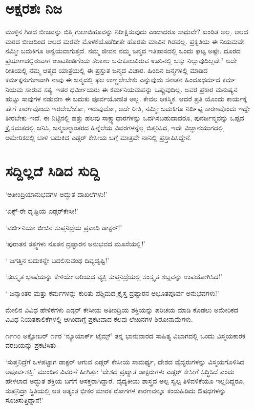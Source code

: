 \section{ಅಕ್ಷರಶಃ ನಿಜ}

ಮುಳ್ಳಿನ ಗಿಡದ ಬೀಜವನ್ನು ಬಿತ್ತಿ ಗುಲಾಬಿಹೂವನ್ನು ನಿರೀಕ್ಷಿಸುವುದು ಎಂದಾದರೂ ಸಾಧುವೇ? ಖಂಡಿತ ಅಲ್ಲ. ಆಲದ ಮರದ ಬೀಜದಿಂದ ಆಲದ ಮರವೇ ಮೊಳಕೆಯೊಡೆದೀತೇ ಹೊರತು ಮಾವಿನ ಗಿಡವಲ್ಲ. ಪ್ರಕೃತಿಯ ಈ ನಿಯಮವೇ ನಮ್ಮೀ ಬದುಕಿಗೂ ಅನ್ವಯವಾಗುತ್ತದೆ. ನಮ್ಮ ಜೀವನ ನಮ್ಮ ಜನ್ಮದ ಇತಿಹಾಸದಲ್ಲಿ ಒಂದು ಘಟ್ಟ ಅಷ್ಟೇ. ದೂರದ ಪ್ರಯಾಣದಲ್ಲಿರುವಾಗ ಊಟತಿಂಡಿಗೆಂದು ಕೆಲಕಾಲ ಅನುಕೂಲವಿರುವ ಊರಿನಲ್ಲಿ ಬಸ್ಸು ನಿಲ್ಲುವುದಿಲ್ಲವೇ? ಅದೇ ರೀತಿಯಲ್ಲಿ ನಮ್ಮ ಆತ್ಮದ ಯಾತ್ರೆಯಲ್ಲಿ ಈ ಪ್ರಸ್ತುತ ಜನ್ಮದ ವಿಚಾರ. ಹಿಂದಿನ ಜನ್ಮಗಳಲ್ಲಿ ಮಾಡಿದ ಕರ್ಮಕ್ಕನುಗುಣವಾಗಿ ನಾವು ಈ ಜನ್ಮದಲ್ಲಿ ಫಲ ಉಣ್ಣಲೇಬೇಕು ಎನ್ನುವುದು ಸನಾತನ ಹಿಂದೂಧರ್ಮದ ಕರ್ಮ ನಿಯಮ ಸಾರುವ ಸತ್ಯ. ಇತರ ಧರ್ಮೀಯರು ಈ ಕರ್ಮನಿಯಮವನ್ನು ಒಪ್ಪುವುದಿಲ್ಲ. ಅವರ ಪ್ರಕಾರ ಮನುಷ್ಯನ ಹುಟ್ಟು ಸಾವುಗಳ ನಡುವಣ ಈ ಬದುಕು ಪೂರ್ವಯೋಜಿತ ಅಲ್ಲ. ಕೇವಲ ಆಕಸ್ಮಿಕ. ಆದರೆ ಪ್ರತಿ ಯೊಂದು ಕಾರ್ಯಕ್ಕೆ ಹೇಗೆ ಕಾರಣವೊಂದು ಇರಲೇಬೇಕೋ, ಇರುವುದೋ, ಅದೇ ರೀತಿ, ನಮ್ಮೀ ಬದುಕಿಗೂ ನಿರ್ದಿಷ್ಟ ಕಾರಣವೊಂದು ಇದ್ದೇ ತೀರಬೇಕು–ಇದೆ. ಈ ನಿಟ್ಟಿನಲ್ಲಿ ಹತ್ತು ಹಲವು ಸಾಕ್ಷ್ಯಾಧಾರಗಳನ್ನು ಒದಗಿಸಬಹುದಾದರೂ, ಪುನರ್ಜನ್ಮವನ್ನು ಒಪ್ಪದ ಕ್ರೈಸ್ತಮತದಲ್ಲಿ ಜನಿಸಿ, ಜನ್ಮಜನ್ಮಾಂತರದ ಹಿನ್ನೆಲೆಯ ವಿವರಗಳನ್ನೆಲ್ಲ ಬಿತ್ತರಿಸಿದ, ಇದೇ ವಿಜ್ಞಾನಯುಗದಲ್ಲಿ ಅಮೇರಿಕದಲ್ಲಿ ಬಾಳಿ ಬದುಕಿದ ಎಡ್ಗರ್ ಕೇಸೀಯ ಬಗ್ಗೆ ಮಾತ್ರವೇ ನಾನಿಲ್ಲಿ ಪ್ರಸ್ತಾಪಿಸಿದ್ದೇನೆ.


\section{ಸದ್ದಿಲ್ಲದೆ ಸಿಡಿದ ಸುದ್ದಿ}

‘ಅತೀಂದ್ರಿಯಾನುಭವಗಳ ಅದ್ಭುತ ದಾಖಲೆಗಳು!’

‘ಎಕ್ಸ್​-ರೇ ದೃಷ್ಟಿಯ ಎಡ್ಗರ್​ಕೇಸೀ!’

‘ವರ್ಜೀನಿಯಾ ಬೀಚಿನ ಸುಪ್ತನಿದ್ರೆಯ ಪ್ರವಾದಿ ಡಾಕ್ಟರ್​!’

‘ಪುರಾತನ ತತ್ತ್ವಗಳು ನೂತನ ದ್ರಷ್ಟಾರನ ಅನುಭವದ ಮೂಸೆಯಲ್ಲಿ!’

‘ ಜಗತ್ತಿನ ಬದುಕನ್ನೇ ಬದಲಿಸುವಂಥ ದಿವ್ಯದೃಷ್ಟಿ!’

‘ಸಂಸ್ಕೃತ ಭಾಷೆಯನ್ನು ಕೇಳಿಯೇ ಅರಿಯದ ವ್ಯಕ್ತಿ ಸುಪ್ತನಿದ್ರೆಯಲ್ಲಿ ಸಂಸ್ಕೃತ ಶಬ್ದವನ್ನು ಉಪಯೋಗಿಸಿದ!’

‘ ಜನ್ಮಾಂತರ ಮತ್ತು ಕರ್ಮಗಳನ್ನು ಕುರಿತು ಪಶ್ಚಿಮದ ಕ್ರೈಸ್ತ ದ್ರಷ್ಟಾರನ ಅಭೂತಪೂರ್ವ ಅನುಭವಗಳು!’

ಮೇಲಿನ ವಿವಿಧ ಹೇಳಿಕೆಗಳು ಎಡ್ಗರ್ ಕೇಸೀಯ ಅತೀಂದ್ರಿಯ ಶಕ್ತಿಯನ್ನು ಪರಿಚಯ ಮಾಡಿ ಕೊಡಲು ಅಮೇರಿಕದ ವಿವಿಧ ನಿಯತಕಾಲಿಕೆಗಳಲ್ಲಿ ಆಗಿಂದಾಗ್ಗೆ ಪ್ರಕಟವಾದ ಕೆಲವು ಲೇಖನಗಳ ಶಿರೋನಾಮೆಗಳು.

೧೯೧೦ ಅಕ್ಟೋಬರ್ ೧೯ರ ‘ನ್ಯೂಯಾರ್ಕ್ ಟೈಮ್ಸ್’ ತನ್ನ ಭಾನುವಾರದ ಸಾಹಿತ್ಯ ವಿಭಾಗದಲ್ಲಿ ಒಂದು ವಿಸ್ಮಯಕಾರಕ ವರದಿಯನ್ನು ಪ್ರಕಟಿಸಿತು–

‘ಸುಪ್ತನಿದ್ರೆಗೆ ಒಳಪಟ್ಟಾಗ ಡಾಕ್ಟರ್ ಆಗುವ ಎಡ್ಗರ್ ಕೇಸೀಯ ಸಾಮರ್ಥ್ಯ, ದೇಶದ ವೈದ್ಯರುಗಳನ್ನು ವಿಸ್ಮಯಗೊಳಿಸಿದ ಅಪೂರ್ವಶಕ್ತಿ.’ ಮುಂದಿನ ವಿವರಣೆ ಹೀಗಿತ್ತು: ‘ದೇಶದ ಪ್ರಖ್ಯಾತ ಡಾಕ್ಟರುಗಳು ಎಡ್ಗರ್ ಕೇಸೀಗೆ ಸಿದ್ಧಿಸಿದೆ ಎಂದು ಹೇಳಲಾದ ಅದ್ಭುತ ಶಕ್ತಿಯ ಬಗೆಗೆ ಆಸಕ್ತರಾಗಿದ್ದಾರೆ. ವೈದ್ಯಕೀಯ ಶಾಸ್ತ್ರದ ಅಲ್ಪ ಸ್ವಲ್ಪ ತಿಳಿವಳಿಕೆಯೂ ಇಲ್ಲದಿದ್ದರೂ, ಸುಪ್ತನಿದ್ರಾ ಸ್ಥಿತಿಯಲ್ಲಿ ಆತ ಅತ್ಯಂತ ಭೀಕರ ಮಾರಕ ರೋಗಗಳ ಕಾರಣವನ್ನೂ ಕಂಡುಹಿಡಿದು ಔಷಧಗಳನ್ನು ಸೂಚಿಸುತ್ತಿದ್ದಾನೆ!’

